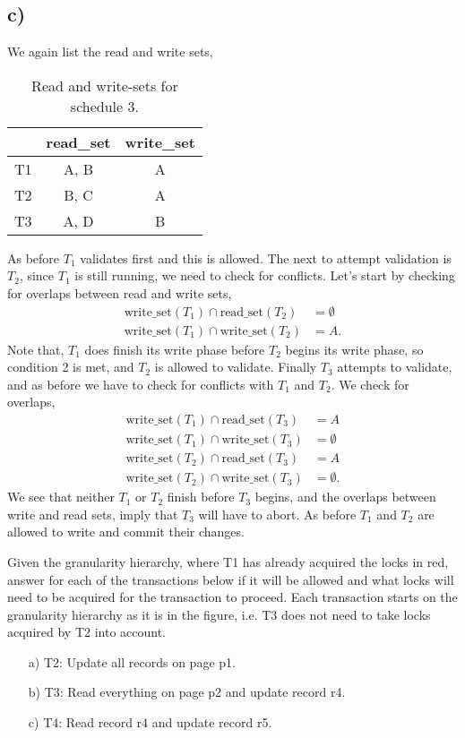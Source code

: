 \documentclass[working, oneside]{../../Preambles/tuftebook}
\begin{document}
\subsection{c)}
We again list the read and write sets,
 \begin{table}[htpb]
    \centering
    \begin{tabular}{c|c|c}
        & read\_set& write\_set \\ \hline
        T1 & A, B & A \\ \hline
        T2 & B, C & A\\ \hline
        T3 & A, D & B
    \end{tabular}
    \caption*{Read and write-sets for schedule 3.}
\end{table}
As before $T_1$ validates first and this is allowed. The next to attempt validation is $T_2$, since $T_1$ is still running, we need to check for conflicts. Let's start by checking for overlaps between read and write sets,
\begin{align*}
 \text{write\_set}(T_1) \cap \text{read\_set}(T_2) &= \emptyset\\
 \text{write\_set}(T_1) \cap \text{write\_set}(T_2) &= A
.\end{align*}
Note that, $T_1$ does finish its write phase before $T_2$ begins its write phase, so condition 2 is met, and $T_2$ is allowed to validate. Finally $T_3$ attempts to validate, and as before we have to check for conflicts with $T_1$ and $T_2$. We check for overlaps,
\begin{align*}
 \text{write\_set}(T_1) \cap \text{read\_set}(T_3) &= A\\
 \text{write\_set}(T_1) \cap \text{write\_set}(T_3) &= \emptyset \\
 \text{write\_set}(T_2) \cap \text{read\_set}(T_3) &= A\\
 \text{write\_set}(T_2) \cap \text{write\_set}(T_3) &= \emptyset
.\end{align*}
We see that neither $T_1$ or $T_2$ finish before $T_3$ begins, and the overlaps between write and read sets, imply that $T_3$ will have to abort. As before $T_1$ and $T_2$ are allowed to write and commit their changes.
\begin{exercise}[2]
Given the granularity hierarchy, where T1 has already acquired the locks in red, answer for each of the transactions below if it will be allowed and what locks will need to be acquired for the transaction to proceed. Each transaction starts on the granularity hierarchy as it is in the figure, i.e. T3 does not need to take locks acquired by T2 into account.
\begin{enumerate}
    \item[a)] T2: Update all records on page p1.
    \item[b)] T3: Read everything on page p2 and update record r4.
    \item[c)] T4: Read record r4 and update record r5.
\end{enumerate}
\end{exercise}
\end{document}
